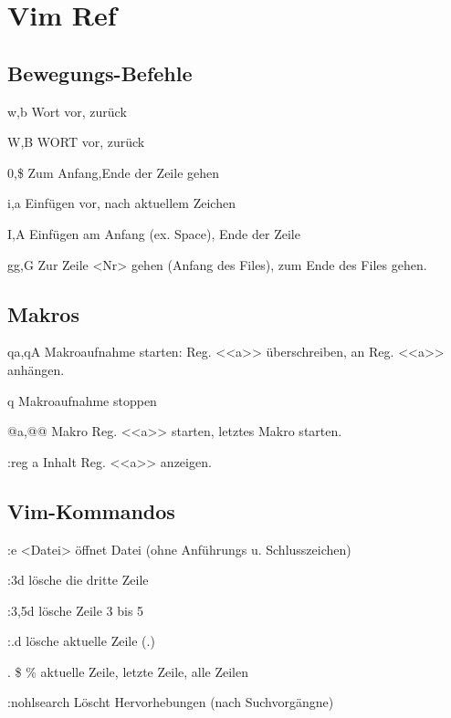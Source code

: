 \documentclass{scrartcl}
\begin{document}
\section*{Vim Ref}

\begin{multicols}{2}

\subsection*{Bewegungs-Befehle}

\begin{description*}
	\item[w,b] Wort vor, zurück
	\item[W,B] WORT vor, zurück
	\item[0,\$] Zum Anfang,Ende der Zeile gehen
	\item[i,a] Einfügen vor, nach aktuellem Zeichen 
	\item[I,A] Einfügen am Anfang (ex. Space), Ende der Zeile
	\item[gg,G] Zur Zeile <Nr> gehen (Anfang des Files), zum Ende des Files gehen. 	  
\end{description*} 

\subsection*{Makros}

\begin{description*}
  \item[qa,qA] Makroaufnahme starten: Reg. <<a>> überschreiben, an Reg. <<a>> anhängen.
   \item[q] Makroaufnahme stoppen
   \item[@a,@@] Makro Reg. <<a>> starten, letztes Makro starten.
   \item[:reg a] Inhalt Reg. <<a>> anzeigen.
\end{description*}

\subsection*{Vim-Kommandos}

\begin{description*}

	\item[:e <Datei>] öffnet Datei (ohne Anführungs u. Schlusszeichen)
	\item[:3d] lösche die dritte Zeile
	\item[:3,5d] lösche Zeile 3 bis 5
	\item[:.d] lösche aktuelle Zeile (.)
	\item[. \$ \%] aktuelle Zeile, letzte Zeile, alle Zeilen
   \item[:nohlsearch] Löscht Hervorhebungen (nach Suchvorgängne)
\end{description*} 


\end{multicols}
\end{document}
